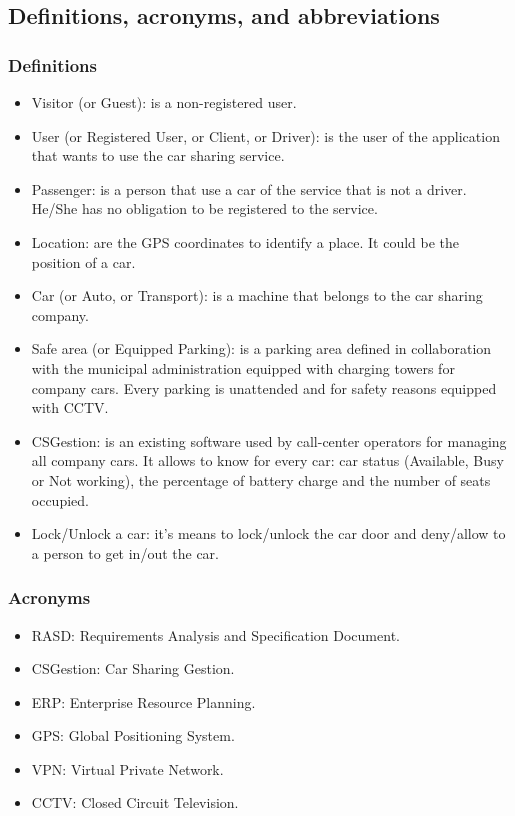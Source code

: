 \documentclass{article}
\begin{document}
		\subsection{Definitions, acronyms, and abbreviations}
		\subsubsection{Definitions}
			\begin{itemize}
				\item Visitor (or Guest): is a non-registered user.
				\item User (or Registered User, or Client, or Driver): is the user of the application that wants to use the car sharing service.
				\item Passenger: is a person that use a car of the service that is not a driver. He/She has no obligation to be registered to the service.
				\item Location: are the GPS coordinates to identify a place. It could be the position of a car.
				\item Car (or Auto, or Transport): is a machine that belongs to the car sharing company.
				\item Safe area (or Equipped Parking): is a parking area defined in collaboration with the municipal administration equipped with charging towers for company cars. Every parking is unattended and for safety reasons equipped with CCTV.
				\item CSGestion: is an existing software used by call-center operators for managing all company cars. It allows to know for every car: car status (Available, Busy or Not working), the percentage of battery charge and the number of seats occupied.
				\item Lock/Unlock a car: it's means to lock/unlock the car door and deny/allow to a person to get in/out the car.
			\end{itemize}
		\subsubsection{Acronyms}
			\begin{itemize}
				\item RASD: Requirements Analysis and Specification Document.
				\item CSGestion: Car Sharing Gestion. 
				\item ERP: Enterprise Resource Planning.
				\item GPS: Global Positioning System.
				\item VPN: Virtual Private Network.
				\item CCTV: Closed Circuit Television.
			\end{itemize}
\end{document}
